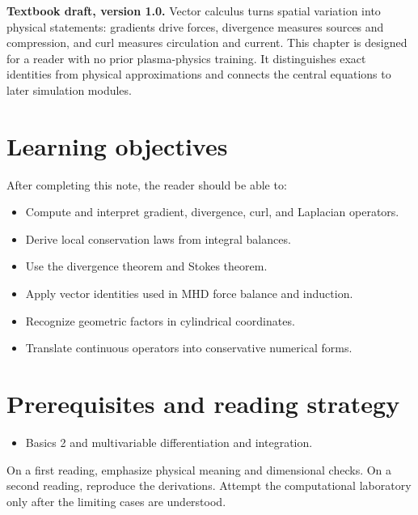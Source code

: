 \documentclass[11pt]{article}
\begin{document}

\begin{overviewbox}
\textbf{Textbook draft, version 1.0.} Vector calculus turns spatial variation into physical statements: gradients drive forces, divergence measures sources and compression, and curl measures circulation and current. This chapter is designed for a reader with no prior plasma-physics training. It distinguishes exact identities from physical approximations and connects the central equations to later simulation modules.
\end{overviewbox}

\ProjectTOC

\section{Learning objectives}
After completing this note, the reader should be able to:
\begin{itemize}[leftmargin=1.6em]
\item Compute and interpret gradient, divergence, curl, and Laplacian operators.
\item Derive local conservation laws from integral balances.
\item Use the divergence theorem and Stokes theorem.
\item Apply vector identities used in MHD force balance and induction.
\item Recognize geometric factors in cylindrical coordinates.
\item Translate continuous operators into conservative numerical forms.
\end{itemize}

\section{Prerequisites and reading strategy}
\begin{itemize}[leftmargin=1.6em]
\item Basics 2 and multivariable differentiation and integration.
\end{itemize}
On a first reading, emphasize physical meaning and dimensional checks. On a second reading, reproduce the derivations. Attempt the computational laboratory only after the limiting cases are understood.
\end{document}
